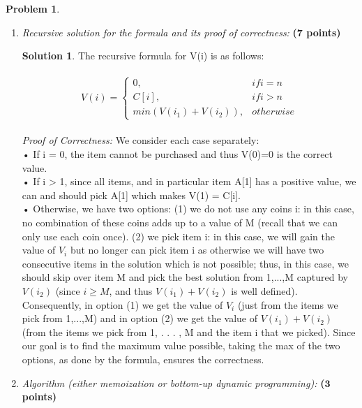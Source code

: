 \documentclass{article}
\theoremstyle{definition}
\newtheorem{problem}{Problem}
\newtheorem*{solution*}{Solution}
\newenvironment{solution}{\begin{solution*}}{{} \end{solution*}}
\newcommand{\grade}[1]{\hfill{\textbf{($\mathbf{#1}$ points)}}}
\begin{document}
\begin{problem}
\begin{enumerate}[label=(\alph*)]
	
	\item \emph{Recursive solution for the formula and its proof of correctness:} \grade{7}
	
	\bigskip	
	\begin{solution}

	The recursive formula for V(i) is as follows: 
	
	\begin{align*}
 		\begin{split}
 			V(i)= \left \{
 			\begin{array}{ll}
 				0,                      				& if  i = n\\
 				C[i],     					& if  i > n\\
 				min({V(i_1) + V(i_2)}),                  & otherwise
 			\end{array}
		\right.
 		\end{split}
	\end{align*}
		
	\emph{Proof of Correctness:} We consider each case separately: \\
	• If i = 0, the item cannot be purchased and thus V(0)=0 is the correct value. \\
	• If i > 1, since all items, and in particular item A[1] has a positive value, we can and should pick A[1] which makes V(1) = C[i]. \\
	• Otherwise, we have two options: (1) we do not use any coins i: in this case, no combination of these coins adds up to a value of M (recall that we can only use each coin once). (2) we pick item i: in this case, we will gain the value 	of $V_i$ but no longer can pick item i as otherwise we will have two consecutive items in the solution which is not possible; thus, in this case, we should skip over item M and pick the best solution from {1,...,M} captured by $V(i_2)$ 	(since $i \geq M$,  and thus $V(i_1) + V(i_2)$ is well defined). \\
	Consequently, in option (1) we get the value of $V_i$ (just from the items we pick from {1,...,M}) and in option (2) we get the value of $V(i_1)+V(i_2)$ (from the items we pick from {1, . . . , M} and the item i that we picked). Since our 	goal is to find the maximum value possible, taking the max of the two options, as done by the formula, ensures the correctness.
	
	
	\end{solution}
	
	
	\newpage
	\item \emph{Algorithm (either memoization or bottom-up dynamic programming):} \grade{3}
	

\end{enumerate}
\end{problem}
\end{document}
